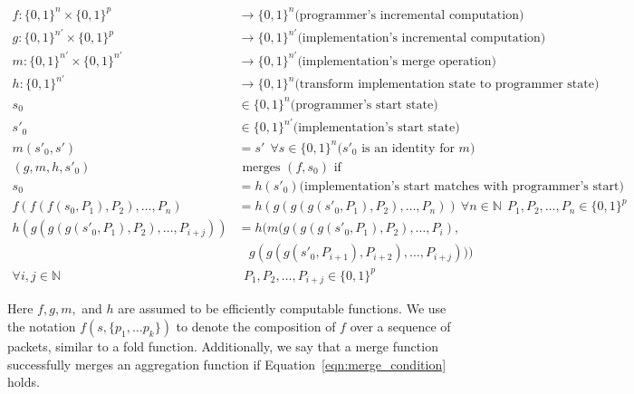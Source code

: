 \begin{align}
f : \{0, 1\}^n \times \{0, 1\}^p & \rightarrow \{0, 1\}^n \mbox{(programmer's incremental computation)} \nonumber \\
g : \{0, 1\}^{n'} \times \{0, 1\}^p  & \rightarrow \{0, 1\}^{n'} \mbox{(implementation's incremental computation)} \nonumber \\
m : \{0, 1\}^{n'} \times \{0, 1\}^{n'} & \rightarrow \{0, 1\}^{n'} \mbox{(implementation's merge operation)} \nonumber \\
h : \{0, 1\}^{n'}               & \rightarrow \{0, 1\}^n  \mbox{(transform
 implementation state to programmer state)} \nonumber \\
s_0  & \in \{0, 1\}^n \mbox{(programmer's start state)} \nonumber \\
s'_0 & \in \{0, 1\}^{n'} \mbox{(implementation's start state)} \nonumber \\
m(s'_0, s') & = s' \ \ \forall s \in \{0, 1\}^{n} \mbox{($s'_0$ is an identity for $m$)} \nonumber \\
(g, m, h, s'_0) & \mbox { merges } (f, s_0) \mbox{ if} \nonumber \\
s_0 & = h(s'_0) \mbox{(implementation's start matches with programmer's start)} \label{eqn:start_condition} \\
f(f(f(s_0, P_1), P_2), \dots, P_n) & = h(g(g(g(s'_0, P_1), P_2), \dots, P_n)) \ \forall n \in \mathbb{N} \ \ P_1, P_2, \dots, P_n \in \{0, 1\}^p \label{eqn:projection_condition} \\
h(g(g(g(s'_0, P_1), P_2), \dots, P_{i+j})) & =h( m(g(g(g(s'_0, P_1), P_2), \dots, P_{i}), \nonumber \\
&\ \ \ \ g(g(g(s'_0, P_{i+1}), P_{i+2}), \dots, P_{i+j}))) \nonumber \\
\forall i, j \in \mathbb{N} & \ \  P_1, P_2, \dots, P_{i+j} \in \{0, 1\}^p \label{eqn:merge_condition}
\end{align}

Here $f, g, m,$ and $h$ are assumed to be efficiently computable functions. We use the notation $f(s, \{p_1, \ldots p_k\})$ to denote the composition of $f$ over a sequence
of packets, similar to a fold function. Additionally, we say that a merge function successfully merges an aggregation function if Equation~\ref{eqn:merge_condition} holds. 


